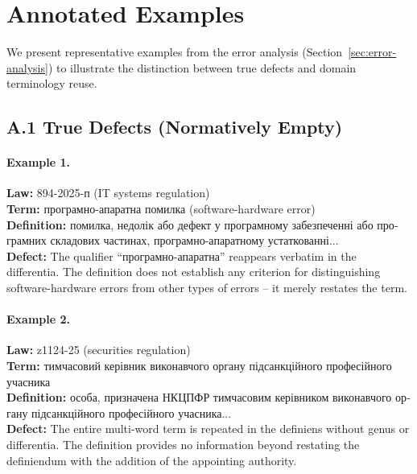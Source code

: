 \documentclass[11pt]{article}
\begin{document}



\clearpage
\appendix
\section{Annotated Examples}
\label{app:examples}

We present representative examples from the error analysis (Section~\ref{sec:error-analysis}) to illustrate the distinction between true defects and domain terminology reuse.

\subsection*{A.1 True Defects (Normatively Empty)}

\paragraph{Example 1.}
\textbf{Law:} 894-2025-\foreignlanguage{ukrainian}{п} (IT systems regulation) \\
\textbf{Term:} \foreignlanguage{ukrainian}{програмно-апаратна помилка} (software-hardware error) \\
\textbf{Definition:} \foreignlanguage{ukrainian}{помилка, недолік або дефект у програмному забезпеченні або програмних складових частинах, програмно-апаратному устаткованні...} \\
\textbf{Defect:} The qualifier \foreignlanguage{ukrainian}{``програмно-апаратна''} reappears verbatim in the differentia. The definition does not establish any criterion for distinguishing software-hardware errors from other types of errors -- it merely restates the term.

\paragraph{Example 2.}
\textbf{Law:} z1124-25 (securities regulation) \\
\textbf{Term:} \foreignlanguage{ukrainian}{тимчасовий керівник виконавчого органу підсанкційного професійного учасника} \\
\textbf{Definition:} \foreignlanguage{ukrainian}{особа, призначена НКЦПФР тимчасовим керівником виконавчого органу підсанкційного професійного учасника...} \\
\textbf{Defect:} The entire multi-word term is repeated in the definiens without genus or differentia. The definition provides no information beyond restating the definiendum with the addition of the appointing authority.
\end{document}

